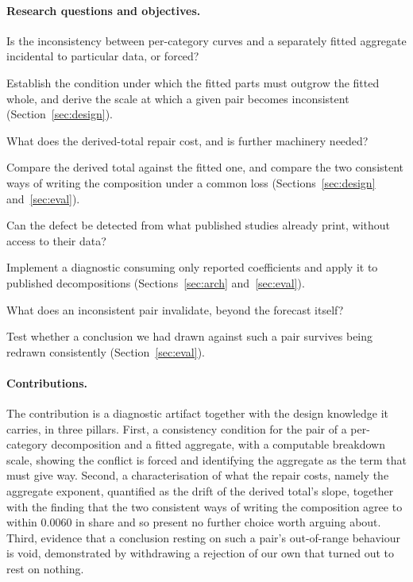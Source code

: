 \documentclass[11pt]{article}
\begin{document}
\paragraph{Research questions and objectives.}
\begin{description}[nosep,leftmargin=2.2em]
\item[RQ1] Is the inconsistency between per-category curves and a separately fitted
aggregate incidental to particular data, or forced?
\item[RO1] Establish the condition under which the fitted parts must outgrow the
fitted whole, and derive the scale at which a given pair becomes inconsistent
(Section~\ref{sec:design}).
\item[RQ2] What does the derived-total repair cost, and is further machinery needed?
\item[RO2] Compare the derived total against the fitted one, and compare the two
consistent ways of writing the composition under a common loss
(Sections~\ref{sec:design} and~\ref{sec:eval}).
\item[RQ3] Can the defect be detected from what published studies already print,
without access to their data?
\item[RO3] Implement a diagnostic consuming only reported coefficients and apply it
to published decompositions (Sections~\ref{sec:arch} and~\ref{sec:eval}).
\item[RQ4] What does an inconsistent pair invalidate, beyond the forecast itself?
\item[RO4] Test whether a conclusion we had drawn against such a pair survives being
redrawn consistently (Section~\ref{sec:eval}).
\end{description}

\paragraph{Contributions.}
The contribution is a diagnostic artifact together with the design knowledge it
carries, in three pillars. First, a consistency condition for the pair of a
per-category decomposition and a fitted aggregate, with a computable breakdown
scale, showing the conflict is forced and identifying the aggregate as the term that
must give way. Second, a characterisation of what the repair costs, namely the
aggregate exponent, quantified as the drift of the derived total's slope, together
with the finding that the two consistent ways of writing the composition agree to
within 0.0060 in share and so present no further choice worth
arguing about. Third, evidence that a conclusion resting on such a pair's
out-of-range behaviour is void, demonstrated by withdrawing a rejection of our own
that turned out to rest on nothing.
\end{document}
